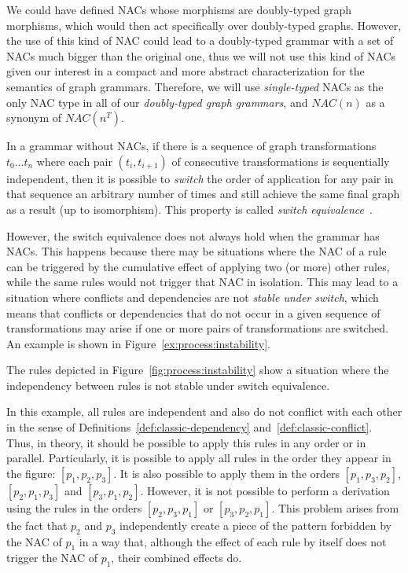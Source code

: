 \begin{remark}
  We could have defined NACs whose morphisms are doubly-typed graph morphisms, which would then act specifically over doubly-typed graphs. However, the use of this kind of NAC could lead to a doubly-typed grammar with a set of NACs much bigger than the original one, thus we will not use this kind of NACs given our interest in a compact and more abstract characterization for the semantics of graph grammars. Therefore, we will use \emph{single-typed} NACs as the only NAC type in all of our \emph{doubly-typed graph grammars}, and $NAC(n)$ as a synonym of $NAC(n^T)$.
\end{remark}

In a grammar without NACs, if there is a sequence of graph transformations $t_0\ldots t_n$ where each pair $(t_i,t_{i+1})$ of consecutive transformations is sequentially independent, then it is possible to \emph{switch} the
order of application for any pair in that sequence an arbitrary number of times and still achieve the same final graph as a result (up to isomorphism). This property is called \emph{switch equivalence}~\cite{Corradini2013}.

However, the switch equivalence does not always hold when the grammar has NACs. This happens because there may be situations where the NAC of a rule can be triggered by the cumulative effect of applying two (or more) other rules, while the same rules would not trigger that NAC in isolation. This may lead to a situation where conflicts and dependencies
	are not \emph{stable under switch}, which means that conflicts or dependencies that do not occur in a given sequence of transformations may arise if one or more pairs of transformations are switched. An example is shown in Figure~\ref{ex:process:instability}.

\begin{example}\label{ex:process:instability}The rules depicted in Figure~\ref{fig:process:instability} show a situation where the independency between rules is not stable under switch equivalence.

  In this example, all rules are independent and also do not conflict with each other in the sense of Definitions~\ref{def:classic-dependency} and~\ref{def:classic-conflict}. Thus, in theory, it should be possible to apply this rules in any order or in parallel. Particularly, it is possible to apply all rules in the order they appear in the figure: $[p_1, p_2, p_3]$. It is also possible to apply them in the orders $[p_1, p_3, p_2]$, $[p_2, p_1, p_3]$ and $[p_3, p_1, p_2]$. However, it is not
  possible to perform a derivation using the rules in the orders $[p_2, p_3, p_1]$ or $[p_3, p_2, p_1]$. This problem arises from the fact that $p_2$ and $p_3$ independently create a piece of the pattern forbidden by the NAC of $p_1$ in a way that, although the effect of each rule by itself does not trigger the NAC of $p_1$, their combined effects do.
\end{example}

